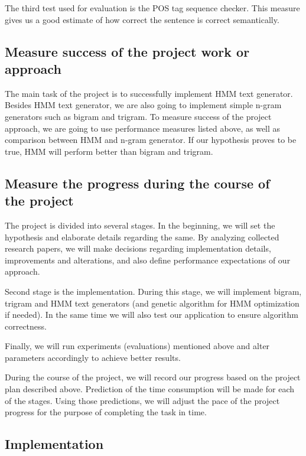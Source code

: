 \documentclass[a4paper,12pt]{article}
\begin{document}
The third test used for evaluation is the POS tag sequence checker. This measure 
gives us a good estimate of how correct the sentence is correct semantically.

\subsection {Measure success of the project work or approach}

The main task of the project is to successfully implement HMM text generator.
Besides HMM text generator, we are also going to implement simple n-gram
generators such as bigram and trigram. To measure success of the project
approach, we are going to use performance measures listed above, as well as
comparison between HMM and n-gram generator. If our hypothesis proves to be
true, HMM will perform better than bigram and trigram.

\subsection {Measure the progress during the course of\\ the project}

The project is divided into several stages. In the beginning, we will set the
hypothesis and elaborate details regarding the same. By analyzing collected
research papers, we will make decisions regarding implementation details,
improvements and alterations, and also define performance expectations of our
approach.

Second stage is the implementation. During this stage, we will implement bigram,
trigram and HMM text generators (and genetic algorithm for HMM optimization if
needed). In the same time we will also test our application to ensure algorithm
correctness.

Finally, we will run experiments (evaluations) mentioned above and alter
parameters accordingly to achieve better results.

During the course of the project, we will record our progress based on the
project plan described above. Prediction of the time consumption will be made
for each of the stages. Using those predictions, we will adjust the pace of the
project progress for the purpose of completing the task in time.

\subsection{Implementation}
\label{sec:impl}
\end{document}
